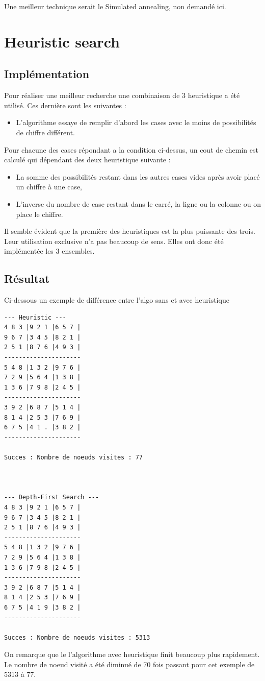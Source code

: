 \documentclass[a4paper,10pt]{article}
\begin{document}
Une meilleur technique serait le Simulated annealing, non demandé ici. 
\section{Heuristic search}

\subsection{Implémentation}

Pour réaliser une meilleur recherche une combinaison de 3 heuristique a été utilisé. Ces dernière sont les suivantes :
\begin{itemize}
	\item L'algorithme essaye de remplir d'abord les cases avec le moins de possibilités de chiffre différent.
\end{itemize}
Pour chacune des cases répondant a la condition ci-dessus, un cout de chemin est calculé qui dépendant des deux heuristique suivante :
\begin{itemize}
	\item La somme des possibilités restant dans les autres cases vides après avoir placé un chiffre à une case,
	\item L'inverse du nombre de case restant dans le carré, la ligne ou la colonne ou on place le chiffre.
\end{itemize}

Il semble évident que la première des heuristiques est la plus puissante des trois. Leur utilisation exclusive n'a pas beaucoup de sens. Elles ont donc été implémentée les 3 ensembles.

\subsection{Résultat}

Ci-dessous un exemple de différence entre l'algo sans et avec heuristique
\begin{verbatim}
--- Heuristic ---
4 8 3 |9 2 1 |6 5 7 |
9 6 7 |3 4 5 |8 2 1 |
2 5 1 |8 7 6 |4 9 3 |
---------------------
5 4 8 |1 3 2 |9 7 6 |
7 2 9 |5 6 4 |1 3 8 |
1 3 6 |7 9 8 |2 4 5 |
---------------------
3 9 2 |6 8 7 |5 1 4 |
8 1 4 |2 5 3 |7 6 9 |
6 7 5 |4 1 . |3 8 2 |
---------------------

Succes : Nombre de noeuds visites : 77



--- Depth-First Search ---
4 8 3 |9 2 1 |6 5 7 |
9 6 7 |3 4 5 |8 2 1 |
2 5 1 |8 7 6 |4 9 3 |
---------------------
5 4 8 |1 3 2 |9 7 6 |
7 2 9 |5 6 4 |1 3 8 |
1 3 6 |7 9 8 |2 4 5 |
---------------------
3 9 2 |6 8 7 |5 1 4 |
8 1 4 |2 5 3 |7 6 9 |
6 7 5 |4 1 9 |3 8 2 |
---------------------

Succes : Nombre de noeuds visites : 5313
\end{verbatim}
On remarque que le l'algorithme avec heuristique finit beaucoup plus rapidement. Le nombre de noeud visité a été diminué de 70 fois passant pour cet exemple de 5313 à 77.
\end{document}
